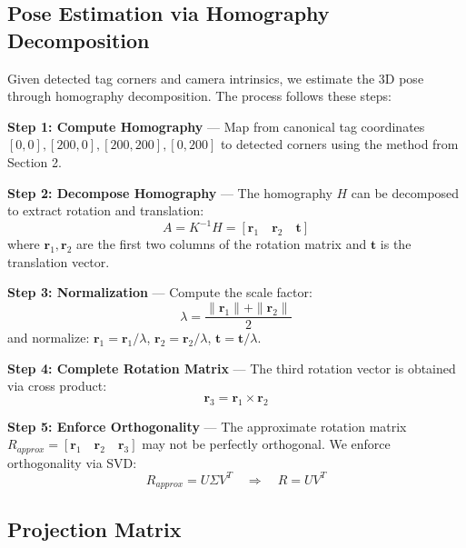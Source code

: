 \documentclass[9pt,a4paper,twocolumn,twoside]{tau-class/tau}
\begin{document}
    \subsection{Pose Estimation via Homography Decomposition}

    Given detected tag corners and camera intrinsics, we estimate the 3D pose through homography decomposition. The process follows these steps:

    \textbf{Step 1: Compute Homography} — Map from canonical tag coordinates $[0,0], [200,0], [200,200], [0,200]$ to detected corners using the method from Section 2.

    \textbf{Step 2: Decompose Homography} — The homography $H$ can be decomposed to extract rotation and translation:
    \begin{equation}
        A = K^{-1} H = [\mathbf{r}_1 \quad \mathbf{r}_2 \quad \mathbf{t}]
    \end{equation}
    where $\mathbf{r}_1, \mathbf{r}_2$ are the first two columns of the rotation matrix and $\mathbf{t}$ is the translation vector.

    \textbf{Step 3: Normalization} — Compute the scale factor:
    \begin{equation}
        \lambda = \frac{\|\mathbf{r}_1\| + \|\mathbf{r}_2\|}{2}
    \end{equation}
    and normalize: $\mathbf{r}_1 = \mathbf{r}_1/\lambda$, $\mathbf{r}_2 = \mathbf{r}_2/\lambda$, $\mathbf{t} = \mathbf{t}/\lambda$.

    \textbf{Step 4: Complete Rotation Matrix} — The third rotation vector is obtained via cross product:
    \begin{equation}
        \mathbf{r}_3 = \mathbf{r}_1 \times \mathbf{r}_2
    \end{equation}

    \textbf{Step 5: Enforce Orthogonality} — The approximate rotation matrix $R_{approx} = [\mathbf{r}_1 \quad \mathbf{r}_2 \quad \mathbf{r}_3]$ may not be perfectly orthogonal. We enforce orthogonality via SVD:
    \begin{equation}
        R_{approx} = U \Sigma V^T \quad \Rightarrow \quad R = U V^T
    \end{equation}

    \subsection{Projection Matrix}
\end{document}
